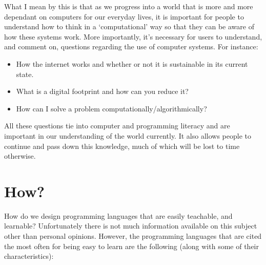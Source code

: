 What I mean by this is that as we progress into a world that is more and more dependant on computers for our everyday lives, it is important for people to understand how to think in a `computational' way so that they can be aware of how these systems work. More importantly, it's necessary for users to understand, and comment on, questions regarding the use of computer systems. For instance:

\begin{itemize}
    \item How the internet works and whether or not it is sustainable in its current state.
    \item What is a digital footprint and how can you reduce it?
    \item How can I solve a problem computationally/algorithmically?
\end{itemize}

All these questions tie into computer and programming literacy and are important in our understanding of the world currently. It also allows people to continue and pass down this knowledge, much of which will be lost to time otherwise.

\section{How?}

How do we design programming languages that are easily teachable, and learnable? Unfortunately there is not much information available on this subject other than personal opinions. However, the programming languages that are cited the most often for being easy to learn are the following (along with some of their characteristics):


